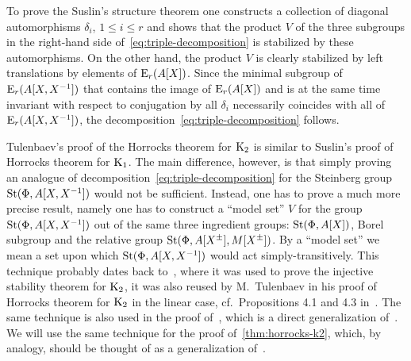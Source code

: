 To prove the Suslin's structure theorem one constructs a collection of diagonal automorphisms $\delta_i$, $1\leq i\leq r$
 and shows that the product $V$ of the three subgroups in the right-hand side of~\eqref{eq:triple-decomposition} is stabilized by these automorphisms.
On the other hand, the product $V$ is clearly stabilized by left translations by elements of $\operatorname{E}_r(A[X])$.
Since the minimal subgroup of $\operatorname{E}_r(A[X, X^{-1}])$ that contains the image of $\operatorname{E}_r(A[X])$ and is at the same time invariant with respect to conjugation by all $\delta_i$
 necessarily coincides with all of $\operatorname{E}_r(A[X, X^{-1}])$, the decomposition~\eqref{eq:triple-decomposition} follows.

Tulenbaev's proof of the Horrocks theorem for $\operatorname{K}_2$ is similar to Suslin's proof of Horrocks theorem for $\operatorname{K}_1$.
The main difference, however, is that simply proving an analogue of decomposition~\eqref{eq:triple-decomposition} for the Steinberg group $\operatorname{St}(\Phi, A[X, X^{-1}])$
 would not be sufficient.
Instead, one has to prove a much more precise result, namely one has to construct a ``model set'' $V$ for the group $\operatorname{St}(\Phi, A[X, X^{-1}])$
 out of the same three ingredient groups: $\operatorname{St}(\Phi, A[X])$, Borel subgroup and the relative group $\operatorname{St}(\Phi, A[X^\pm], M[X^\pm])$.
By a ``model set'' we mean a set upon which $\operatorname{St}(\Phi, A[X, X^{-1}])$ would act simply-transitively.
This technique probably dates back to~\cite{ST76}, where it was used to prove the injective stability theorem for $\operatorname{K}_2$, it was also reused
 by M.~Tulenbaev in his proof of Horrocks theorem for $\operatorname{K}_2$ in the linear case, cf.\ Propositions 4.1 and 4.3 in~\cite{Tu83}.
The same technique is also used in the proof of~\cite[Theorem~3]{LS20}, which is a direct generalization of~\cite[Proposition~4.3]{Tu83}.
We will use the same technique for the proof of~\cref{thm:horrocks-k2}, which, by analogy, should be thought of as a generalization of~\cite[Proposition~4.1]{Tu83}.

